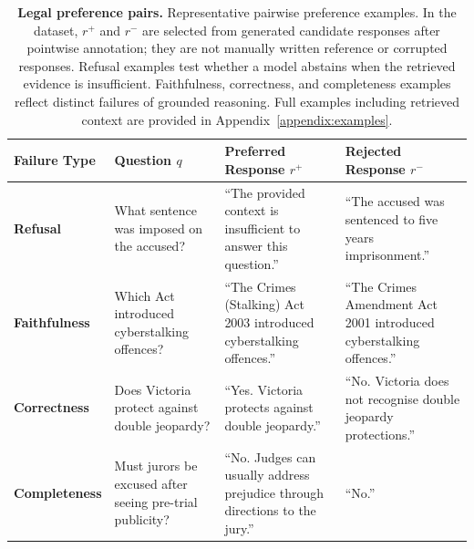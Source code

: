 \documentclass{article}
\theoremstyle{plain}
\theoremstyle{definition}
\theoremstyle{remark}
\begin{document}
\begin{table}[!t]
\centering
\small
\begin{tabular}{p{1.8cm} p{3.2cm} p{4.5cm} p{4.5cm}}
\toprule
\textbf{Failure Type} & \textbf{Question} ${q}$ & \textbf{Preferred Response} ${r^{+}}$ & \textbf{Rejected Response} ${r^{-}}$ \\
\midrule

\textbf{Refusal} &
What sentence was imposed on the accused? &
\cellcolor{PrimaryGold!35}
``The provided context is insufficient to answer this question.'' &
\cellcolor{NeutralGrey!20}
``The accused was sentenced to five years imprisonment.'' \\

\midrule

\textbf{Faithfulness} &
Which Act introduced cyberstalking offences? &
\cellcolor{PrimaryGold!35}
``The Crimes (Stalking) Act 2003 introduced cyberstalking offences.'' &
\cellcolor{NeutralGrey!20}
``The Crimes Amendment Act 2001 introduced cyberstalking offences.'' \\

\midrule

\textbf{Correctness} &
Does Victoria protect against double jeopardy? &
\cellcolor{PrimaryGold!35}
``Yes. Victoria protects against double jeopardy.'' &
\cellcolor{NeutralGrey!20}
``No. Victoria does not recognise double jeopardy protections.'' \\

\midrule

\textbf{Completeness} &
Must jurors be excused after seeing pre-trial publicity? &
\cellcolor{PrimaryGold!35}
``No. Judges can usually address prejudice through directions to the jury.'' &
\cellcolor{NeutralGrey!20}
``No.'' \\

\bottomrule
\end{tabular}
\caption{
\textbf{Legal preference pairs.} Representative pairwise preference examples. In the dataset, $r^{+}$ and $r^{-}$ are selected from generated candidate responses after pointwise annotation; they are not manually written reference or corrupted responses. Refusal examples test whether a model abstains when the retrieved evidence is insufficient. Faithfulness, correctness, and completeness examples reflect distinct failures of grounded reasoning. Full examples including retrieved context are provided in Appendix~\ref{appendix:examples}.
}
\label{tab:failure_categories}
\end{table}
\end{document}
